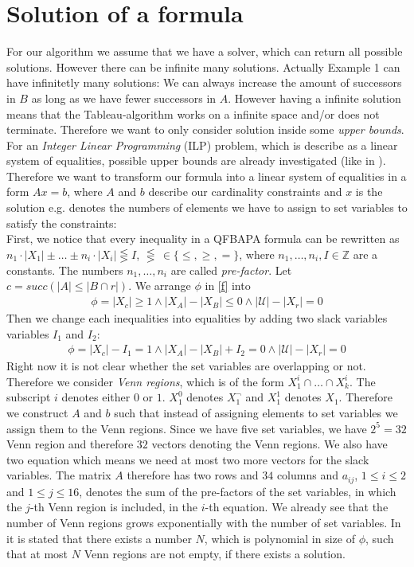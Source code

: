 \documentclass{book}
\theoremstyle{break}
\theoremstyle{definition}
\begin{document}
\section{Solution of a formula}
For our algorithm we assume that we have a solver, which can return all possible solutions. However there can be infinite many solutions. Actually Example 1 can have infinitetly many solutions: We can always increase the amount of successors in $B$ as long as we have fewer successors in $A$. However having a infinite solution means that the Tableau-algorithm works on a infinite space and/or does not terminate. Therefore we want to only consider solution inside some \textit{upper bounds}. For an \textit{Integer Linear Programming} (ILP) problem, which is describe as a linear system of equalities, possible upper bounds are already investigated (like in \cite{knapsack}). Therefore we want to transform our formula into a linear system of equalities in a form $Ax=b$, where $A$ and $b$ describe our cardinality constraints and $x$ is the solution e.g. denotes the numbers of elements we have to assign to set variables to satisfy the constraints:\\
First, we notice that every inequality in a QFBAPA formula can be
rewritten as $n_1\cdot|X_1|\pm \dots \pm n_i\cdot|X_i|\lesseqgtr I$, $\lesseqgtr\,\in\{\leq,\geq,=\}$, where $n_1,\dots, n_i,I\in\mathbb{Z}$ are a constants. The numbers $n_1,\dots,n_i$ are called \textit{pre-factor}. Let $c={succ(|A|\leq |B\cap r|)}$. We arrange $\phi$ in \eqref{f} into
\begin{align*}
\phi=|X_{c}|\geq 1\wedge |X_A|- |X_B|\leq 0 \wedge |\mathcal{U}|-|X_r|=0
\end{align*} 
Then we change each inequalities into equalities by adding two slack variables variables $I_1$ and $I_2$:
\begin{align*}
\phi=|X_{c}|- I_1= 1\wedge |X_A|-|X_B|+I_2= 0 \wedge |\mathcal{U}|-|X_r|=0
\end{align*}
Right now it is not clear whether the set variables are overlapping or not. Therefore we consider \textit{Venn regions}, which is of the form $X^i_1\cap \dots \cap X^i_k$. The subscript $i$ denotes either $0$ or $1$. $X^0_1$ denotes $X^\neg_1$ and $X^1_1$ denotes $X_1$. Therefore we construct $A$ and $b$ such that instead of assigning elements to set variables we assign them to the Venn regions. Since we have five set variables, we have $2^5=32$ Venn region and therefore $32$ vectors denoting the Venn regions. We also have two equation which means we need at most two more vectors for the slack variables. The matrix $A$ therefore has two rows and $34$ columns and $a_{ij}$, $1\leq i\leq 2$ and $1\leq j\leq 16$, denotes the sum of the pre-factors of the set variables, in which the $j$-th Venn region is included, in the $i$-th equation. We already see that the number of Venn regions grows exponentially with the number of set variables. In \cite{4} it is stated that there exists a number $N$, which is polynomial in size of $\phi$, such that at most $N$ Venn regions are not empty, if there exists a solution.
\end{document}
